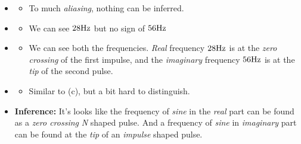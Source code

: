 \documentclass[../../course]{subfiles}
\begin{document}
\begin{itemize} [label=]

    \item \sampFreqMuchLess
        \begin{itemize} [label=]
            \item To much \emph{aliasing}, nothing can be inferred.
        \end{itemize}

    \item \sampFreqNorm
        \begin{itemize} [label=]
            \item We can see $\freqXOne \si{Hz}$ but no sign of $\freqXTwo \si{Hz}$
        \end{itemize}

    \item \sampFreqSligGreat
        \begin{itemize} [label=]
            \item We can see both the frequencies. \emph{Real} frequency $\freqXOne \si{Hz}$
                is at the \emph{zero crossing} of the first impulse, and the \emph{imaginary}
                frequency $\freqXTwo \si{Hz}$ is at the \emph{tip} of the second pulse.
        \end{itemize}

    \item \sampFreqMuchGreat
        \begin{itemize} [label=]
            \item Similar to (c), but a bit hard to distinguish.
        \end{itemize}

    \item \textbf{Inference:} It's looks like the frequency of \emph{sine} in the \emph{real}
        part can be found as a \emph{zero crossing} \emph{N} shaped pulse. And a frequency of \emph{sine}
        in \emph{imaginary} part can be found at the \emph{tip} of an \emph{impulse} shaped pulse.


\end{itemize}

\vfill
\end{document}
